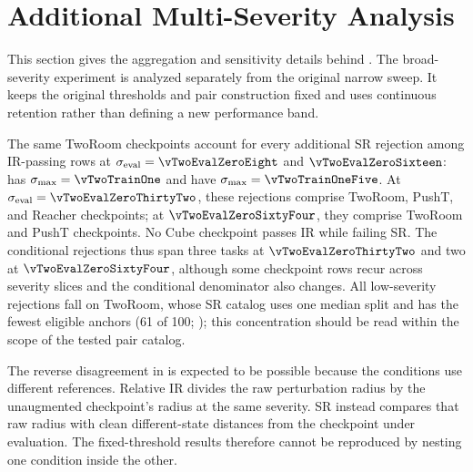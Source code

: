 \section{Additional Multi-Severity Analysis}
\label{sec:appendix-multiseverity}

\providecommand{\vTwoNumberMacros}{tables/multiseverity_numbers}

\providecommand{\vTwoAssociationTable}{tables/table_multiseverity_associations}
\providecommand{\vTwoDecisionTable}{tables/table_multiseverity_decisions}

This section gives the aggregation and sensitivity details behind
. The broad-severity experiment is
analyzed separately from the original narrow sweep. It keeps the original
thresholds and pair construction fixed and uses continuous retention rather
than defining a new performance band.

The same \vTwoVetoAtZeroEight{} TwoRoom checkpoints account for every
additional SR rejection among IR-passing rows at
$\sigma_{\mathrm{eval}}=\vTwoEvalZeroEight$ and
$\vTwoEvalZeroSixteen$: \vTwoLowVetoAtOne{} has
$\sigma_{\max}=\vTwoTrainOne$ and \vTwoLowVetoAtOneFive{} have
$\sigma_{\max}=\vTwoTrainOneFive$. At
$\sigma_{\mathrm{eval}}=\vTwoEvalZeroThirtyTwo$, these rejections comprise
\vTwoVetoThirtyTwoTwoRoom{} TwoRoom, \vTwoVetoThirtyTwoPushT{} PushT, and
\vTwoVetoThirtyTwoReacher{} Reacher checkpoints; at
$\vTwoEvalZeroSixtyFour$, they comprise
\vTwoVetoSixtyFourTwoRoom{} TwoRoom and \vTwoVetoSixtyFourPushT{} PushT
checkpoints. No Cube checkpoint passes IR while failing SR. The conditional
rejections thus
span three tasks at $\vTwoEvalZeroThirtyTwo$ and two at
$\vTwoEvalZeroSixtyFour$, although some checkpoint rows recur across severity
slices and the conditional denominator also changes. All low-severity
rejections fall on TwoRoom, whose SR catalog uses one median split and has the
fewest eligible anchors (61 of 100; \vTwoSRLabelReference); this concentration should be
read within the scope of the tested pair catalog.


\FloatBarrier

The reverse disagreement in
 is expected to be possible
because the conditions use different references. Relative IR divides the raw
perturbation radius by the unaugmented checkpoint's radius at the same
severity. SR instead compares that raw radius with clean different-state
distances from the checkpoint under evaluation. The fixed-threshold results
therefore cannot be reproduced by nesting one condition inside the other.

